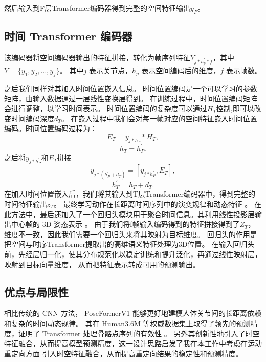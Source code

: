 然后输入到F层Transformer编码器得到完整的空间特征输出$y_{F}$。
\subsection{时间 Transformer 编码器}
该编码器将空间编码器输出的特征拼接，转化为帧序列特征$Y_{j*h^{'}_{p}*f}$，其中
$Y = \{y_1, y_2, \ldots, y_f\}$。
其中$j$ 表示关节点，$h^{'}_{p}$ 表示空间编码后的维度，$f$ 表示帧数。

之后我们同样对其加入时间位置嵌入信息。
时间位置编码是一个可以学习的参数矩阵，由输入数据通过一层线性变换层得到。
在训练过程中，时间位置编码矩阵会进行调整，以学习时间表示。
时间位置编码的复杂度可以通过$H_{T}$控制,即可以改变时间编码深度$d_{T}$。
在嵌入过程中我们会对每一帧对应的空间特征嵌入时间位置编码。时间位置编码过程为：
\begin{equation}
  E_{T} = y_{j*h_{T}} * H_{T},
\end{equation}
\begin{equation}
h_{T} = h^{'}_{P}.
\end{equation}
之后将$y_{j*h^{'}_{P}}$和$E_{T}$拼接
\begin{equation}
y_{j*(h^{'}_{P}+d_{T})} = [y_{j*h^{'}_{P}} , E_{T}],
\end{equation}
\begin{equation}
h^{'}_{T} = h_{T}+d_{T}.
\end{equation}
在加入时间位置嵌入后，我们将其输入到T层Transformer编码器中，得到完整的时间特征输出$z_{T}$。
最终学习动作在长距离时间序列中的演变规律和动态特征 。
在此方法中，最后还加入了一个回归头模块用于聚合时间信息。其利用线性投影层输出中心帧的 3D 姿态表示 。
由于我们将f帧输入编码得到的特征拼接得到了$Z_{T}$，维度不一致，因此我们需要一个回归头来将其映射为目标维度。
回归头的作用是把空间与时序Transformer提取出的高维语义特征处理为3D位置。
在输入回归头前，先经层归一化，使其分布规范化以稳定训练和提升泛化，再通过线性映射层，映射到目标向量维度，
从而把特征表示转成可用的预测输出。
\subsection{优点与局限性}
相比传统的 CNN 方法，
PoseFormerV1 能够更好地建模人体关节间的长距离依赖和复杂的时间动态规律。
其在 Human3.6M 等权威数据集上取得了领先的预测精度，证明了 Transformer 处理骨骼点序列的有效性 。
另外其创新性地引入了时空特征融合，从而提高模型预测精度，这一设计思路启发了我在本工作中考虑在运动重定向方面
引入时空特征融合，从而提高重定向结果的稳定性和预测精度。

